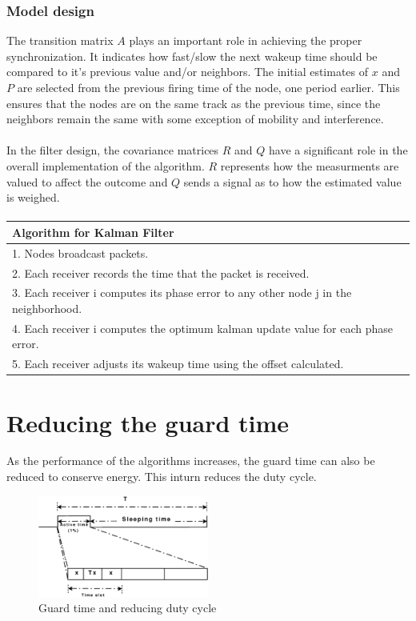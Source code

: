 \documentclass[a4paper,10pt]{report}
\begin{document}
\subsubsection{Model design}
The transition matrix $A$ plays an important role in achieving the proper synchronization. It indicates how fast/slow the next wakeup time should be compared to it's previous value and/or neighbors. The initial estimates of $x$ and $P$ are selected from the previous firing time of the node, one period earlier. This ensures that the nodes are on the same track as the previous time, since the neighbors remain the same with some exception of mobility and interference. \paragraph*{}
In the filter design, the covariance matrices $R$ and $Q$ have a significant
role in the overall implementation of the algorithm. $R$ represents how
 the measurments are valued to affect the outcome and $Q$
sends a signal as to how the estimated value is weighed.
\paragraph*{}
\begin{tabular}{  l }Algorithm for Kalman Filter \\ \hline \hline
1. Nodes broadcast packets. \\  2. Each receiver records the time that the packet is received. \\
3. Each receiver i computes its phase error to any other node j in the neighborhood. \\
4. Each receiver i computes the optimum kalman update value for each phase error. \\
5. Each receiver adjusts its wakeup time using the offset calculated.\\
\hline \hline
\end{tabular}
\section{\textbf{Reducing the guard time}}
As the performance of the algorithms increases, the guard time can also be reduced to conserve energy. This inturn
reduces the duty cycle.
\begin{figure}
\centering
\includegraphics[width=0.5\textwidth]{guardtimesaving}
\caption{Guard time and reducing duty cycle} \label{guardtimesaving}
\end{figure}
\end{document}

